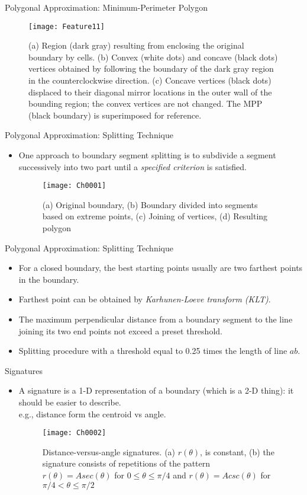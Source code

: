 \begin{frame}{Polygonal Approximation: Minimum-Perimeter Polygon}
\begin{figure}
\texttt{[image: Feature11]}
\caption{(a) Region (dark gray) resulting from enclosing the original boundary by cells.
(b) Convex (white dots) and concave (black dots) vertices obtained by following the boundary of the dark
gray region in the counterclockwise direction. (c) Concave vertices (black dots) displaced to their diagonal
mirror locations in the outer wall of the bounding region; the convex vertices are not changed. The MPP
(black boundary) is superimposed for reference.}
\end{figure}
\end{frame}

\begin{frame}{Polygonal Approximation: Splitting Technique}
\begin{itemize}
\item One approach to boundary segment splitting is 
to subdivide a segment successively into two 
part until a \textit{\color{mycolor1}specified criterion} is satisfied.
\begin{figure}
\texttt{[image: Ch0001]}
\caption{(a) Original boundary, (b) Boundary divided into segments based on extreme points, (c) Joining of vertices, (d) Resulting polygon}
\end{figure}
\end{itemize}
\end{frame}

\begin{frame}{Polygonal Approximation: Splitting Technique}
\begin{itemize}
\item For a closed boundary, the best starting points 
usually are two farthest points in the boundary.
\item Farthest point can be obtained by \textit{\color{mycolor1}Karhunen-Loeve transform (KLT)}.
\item The maximum perpendicular distance from a boundary segment to the line joining its two end points not exceed a preset threshold.
\item Splitting procedure with a threshold equal to 
0.25 times the length of line $ab$.
\end{itemize}
\end{frame}

\begin{frame}{Signatures}
\begin{itemize}
\item A signature is a 1-D representation of a boundary (which is a 2-D thing): it should be easier to describe.\\ e.g., distance form the centroid vs angle.
\begin{figure}
\texttt{[image: Ch0002]}
\caption{Distance-versus-angle signatures. (a) $r(\theta)$, is constant, (b) the signature consists of repetitions of the pattern $r(\theta)=Asec(\theta)$ for $0\leq \theta \leq \pi/4$ and $r(\theta)=Acsc(\theta)$ for $\pi/4<\theta\leq \pi/2$}
\end{figure}
\end{itemize}
\end{frame}

